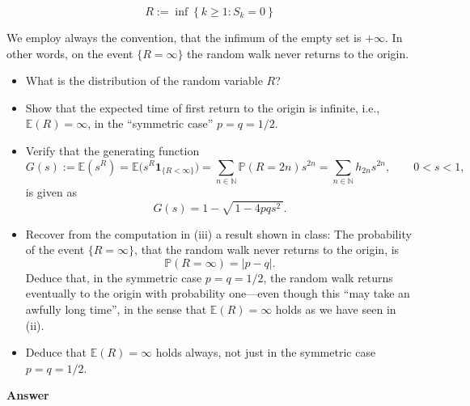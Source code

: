 \documentclass[letterpaper]{article}
\begin{document}
		$$
		R:=\inf \left\{k \geq 1: S_{k}=0\right\}
		$$
		
		We employ always the convention, that the infimum of the empty set is $+\infty$. In other words, on the event $\{R=\infty\}$ the random walk never returns to the origin.
		
		\begin{itemize}
			\item[(i)] What is the distribution of the random variable $R$?
			
			\item[(ii)] Show that the expected time of first return to the origin is infinite, i.e., $\mathbb{E}(R)=\infty$, in the ``symmetric case'' $p=q=1/2$.
			
			\item[(iii)] Verify that the generating function
			\[
			G(s):=\mathbb{E}(s^{R})
			=\mathbb{E}\bigl(s^{R}\mathbf{1}_{\{R<\infty\}}\bigr)
			=\sum_{n\in\mathbb{N}}\mathbb{P}(R=2n)s^{2n}
			=\sum_{n\in\mathbb{N}} h_{2n}s^{2n},
			\qquad 0<s<1,
			\]
			is given as
			\[
			G(s)=1-\sqrt{\,1-4pqs^{2}\,}.
			\]
			
			\item[(iv)] Recover from the computation in (iii) a result shown in class: The probability of the event $\{R=\infty\}$, that the random walk never returns to the origin, is
			\[
			\mathbb{P}(R=\infty)=|p-q|.
			\]
			Deduce that, in the symmetric case $p=q=1/2$, the random walk returns eventually to the origin with probability one---even though this ``may take an awfully long time'', in the sense that $\mathbb{E}(R)=\infty$ holds as we have seen in (ii).
			
			\item[(v)] Deduce that $\mathbb{E}(R)=\infty$ holds always, not just in the symmetric case $p=q=1/2$.
		\end{itemize}
		
		
		\textbf{Answer}
		
		\clearpage
		
		
	
\end{document}
